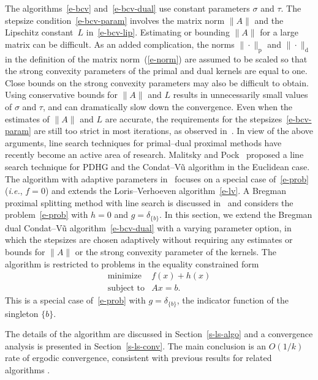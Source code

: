 \documentclass[letterpaper,11pt]{article}
\newcommand{\ie}{{\it i.e.}}
\newcommand{\primal}{\mathrm p}
\newcommand{\dual}{\mathrm d}
\begin{document}
The algorithms~\eqref{e-bcv} and~\eqref{e-bcv-dual} 
use constant parameters $\sigma$ and $\tau$.
The stepsize condition~\eqref{e-bcv-param} involves
the matrix norm $\|A\|$ and the Lipschitz constant~$L$ 
in~\eqref{e-bcv-lip}.
Estimating or bounding $\|A\|$ for a large matrix can be difficult.
As an added complication, the norms $\|\cdot\|_\primal$ and
$\|\cdot\|_\dual$ in the definition of the matrix norm~(\ref{e-norm})
are assumed to be scaled
so that the strong convexity parameters of the primal and dual kernels
are equal to one.  Close bounds on the strong convexity parameters 
may also be difficult to obtain.
Using conservative bounds for $\|A\|$ and $L$ 
results in unnecessarily small values of $\sigma$ and $\tau$, 
and can dramatically slow down the convergence.
Even when the estimates of $\|A\|$ and $L$ are accurate,
the requirements for the stepsizes~\eqref{e-bcv-param} are still
too strict in most iterations, as observed in~\cite{ADH+:21}.
In view of the above arguments,
line search techniques for primal--dual proximal methods have recently 
become an active area of research.
Malitsky and Pock~\cite{MaP:18} proposed a line search technique
for PDHG and the Condat--V\~u algorithm in the Euclidean case.
The algorithm with adaptive parameters in~\cite{VMC21}
focuses on a special case of~\eqref{e-prob} (\ie, $f=0$)
and extends the Loris--Verhoeven algorithm~\eqref{e-lv}.
A Bregman proximal splitting method with line search
is discussed in~\cite{JV22}
and considers the problem~\eqref{e-prob} with $h=0$ and $g=\delta_{\{b\}}$.
In this section, we extend the Bregman dual Condat--V\~u 
algorithm~\eqref{e-bcv-dual} with a varying parameter option,
in which the stepsizes are chosen adaptively without requiring
any estimates or bounds for $\|A\|$ or the strong convexity parameter 
of the kernels.
The algorithm is restricted to problems in the equality constrained
form
\begin{equation} \label{e-lcp-prob}
 \begin{array}{ll}
   \mbox{minimize} & f(x) + h(x) \\
   \mbox{subject to} & Ax=b.
 \end{array}
\end{equation}
This is a special case of~\eqref{e-prob} with $g=\delta_{\{b\}}$,
the indicator function of the singleton $\{b\}$.

The details of the algorithm are discussed in Section~\ref{s-ls-algo}
and a convergence analysis is presented in Section~\ref{s-ls-conv}.
The main conclusion is an $O(1/k)$ rate of ergodic convergence,
consistent with previous results for related algorithms
\cite{MaP:18,JV22}.
\end{document}
